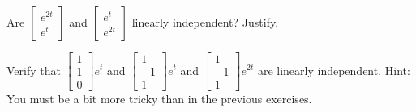 \documentclass{ximera}
\begin{document}
\begin{exercise}%
    Are
    $\left[ 
        \begin{smallmatrix}
            e^{2t} \\ 
            e^t
        \end{smallmatrix}
    \right]$
    and
    $\left[ 
        \begin{smallmatrix}
            e^{t} \\ 
            e^{2t}
        \end{smallmatrix}
    \right]$
    linearly independent?  Justify.
\end{exercise}

\begin{exercise}
    Verify that
    $\left[ 
        \begin{smallmatrix}
            1 \\ 
            1 \\ 
            0
        \end{smallmatrix} 
    \right] e^{t}$ 
    and
    $\left[ 
        \begin{smallmatrix}
            1 \\ 
            -1 \\ 
            1
        \end{smallmatrix} 
    \right] e^{t}$ 
    and
    $\left[ 
        \begin{smallmatrix}
            1 \\ 
            -1 \\ 
            1
        \end{smallmatrix} 
    \right] e^{2t}$ 
    are linearly independent.  Hint: You must be a bit more tricky than in the previous exercises.
\end{exercise}
\end{document}
